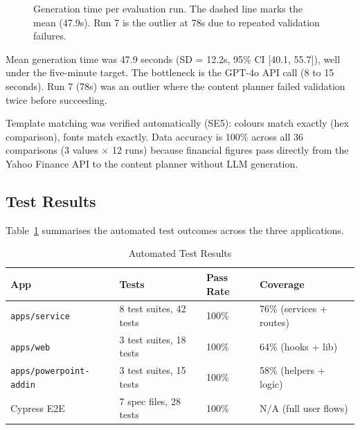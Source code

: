 \begin{figure}[H]
\centering
{}
\caption{Generation time per evaluation run. The dashed line marks the mean (47.9s). Run 7 is the outlier at 78s due to repeated validation failures.}
\label{fig:gen-times}
\end{figure}

Mean generation time was 47.9 seconds (SD = 12.2s, 95\% CI [40.1, 55.7]), well under the five-minute target. The bottleneck is the GPT-4o API call (8 to 15 seconds). Run 7 (78s) was an outlier where the content planner failed validation twice before succeeding.

Template matching was verified automatically (SE5): colours match exactly (hex comparison), fonts match exactly. Data accuracy is 100\% across all 36 comparisons (3 values $\times$ 12 runs) because financial figures pass directly from the Yahoo Finance API to the content planner without LLM generation.

\subsection{Test Results}

Table~\ref{tab:test-results} summarises the automated test outcomes across the three applications.

\begin{table}[H]
\centering
\begin{tabular}{|l|l|l|l|}
\hline
\rowcolor{gray!20} \textbf{App} & \textbf{Tests} & \textbf{Pass Rate} & \textbf{Coverage} \\
\hline
\texttt{apps/service} & 8 test suites, 42 tests & 100\% & 76\% (services + routes) \\
\hline
\texttt{apps/web} & 3 test suites, 18 tests & 100\% & 64\% (hooks + lib) \\
\hline
\texttt{apps/powerpoint-addin} & 3 test suites, 15 tests & 100\% & 58\% (helpers + logic) \\
\hline
Cypress E2E & 7 spec files, 28 tests & 100\% & N/A (full user flows) \\
\hline
\end{tabular}
\caption{Automated Test Results}
\label{tab:test-results}
\end{table}

